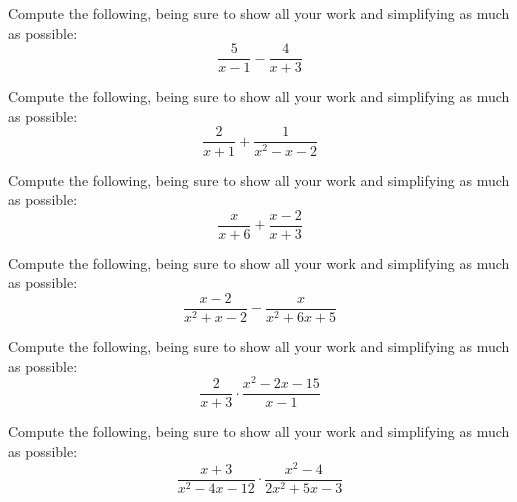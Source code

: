 \documentclass[11pt,letterpaper]{article}
\begin{document}

 Compute the following, being sure to show all your work and simplifying as much as possible:
	\[
	\dfrac{5}{x - 1} - \dfrac{4}{x + 3}
	\]





\newpage





 Compute the following, being sure to show all your work and simplifying as much as possible:
	\[
	\dfrac{2}{x + 1} + \dfrac{1}{x^2 - x - 2}
	\]





\newpage





 Compute the following, being sure to show all your work and simplifying as much as possible:
	\[
	\dfrac{x}{x + 6} + \dfrac{x - 2}{x + 3}
	\]





\newpage





 Compute the following, being sure to show all your work and simplifying as much as possible:
	\[
	\dfrac{x - 2}{x^2 + x - 2} - \dfrac{x}{x^2 + 6x + 5}
	\]





\newpage





 Compute the following, being sure to show all your work and simplifying as much as possible:
	\[
	\dfrac{2}{x + 3} \cdot \dfrac{x^2 - 2x - 15}{x - 1}
	\]





\newpage





 Compute the following, being sure to show all your work and simplifying as much as possible:
	\[
	\dfrac{x + 3}{x^2 - 4x - 12} \cdot \dfrac{x^2 - 4}{2x^2 + 5x - 3}
	\]
\end{document}
